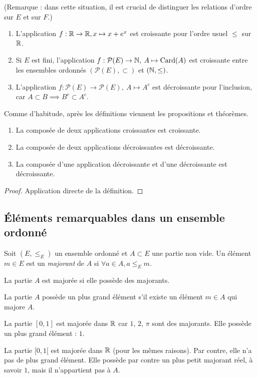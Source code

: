 (Remarque : dans cette situation, il est crucial de distinguer les relations d'ordre sur $E$ et sur $F$.)

\begin{exemple}
\begin{enumerate}
\item L'application $f : \mathbb{R}\to \mathbb{R}, x\mapsto x+e^x$ est croissante pour l'ordre usuel $\leq $ sur $\mathbb{R}$.
\item Si $E$ est fini, l'application $f : \mathcal P(E) \to \mathbb{N}, \: A\mapsto \operatorname{Card}(A)$ est croissante entre les ensembles ordonnés $(\mathcal P(E), \subset)$ et $(\mathbb{N}, \leq)$.
\item L'application $f : \mathcal P(E) \to \mathcal P(E), \: A\mapsto A^c$ est décroissante pour l'inclusion, car $A\subset B \implies B^c\subset A^c$.
\end{enumerate}
\end{exemple}

Comme d'habitude, après les définitions viennent les propositions et théorèmes.

\begin{proposition}
\begin{enumerate}
\item La composée de deux applications croissantes est croissante.
\item La composée de deux applications décroissantes est décroissante.
\item La composée d'une application décroissante et d'une décroissante est décroissante.
\end{enumerate}
\end{proposition}

\begin{proof}
Application directe de la définition.
\end{proof}

\subsection{Éléments remarquables dans un ensemble ordonné}

Soit $(E,\leq_E)$ un ensemble ordonné et $A\subset E$ une partie non vide. Un élément $m\in E$ est un \emph{majorant} de $A$ si $\forall a\in A, a\leq_E m$.

La partie $A$ est majorée si elle possède des majorants.

La partie $A$ possède un plus grand élément s'il existe un élément $m\in A$ qui majore $A$.

\begin{exemple}
La partie $[0,1]$ est majorée dans $\mathbb{R}$ car $1$, $2$, $\pi$ sont des majorants. Elle possède un plus grand élément : $1$.

La partie $[0,1[$ est majorée dans $\mathbb{R}$ (pour les mêmes raisons). Par contre, elle n'a pas de plus grand élément. Elle possède par contre un plus petit majorant réel, à savoir $1$, mais il n'appartient pas à  $A$.
\end{exemple}

